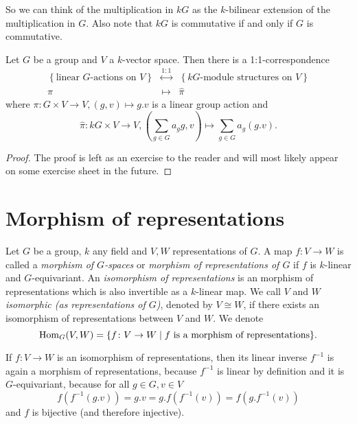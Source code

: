 So we can think of the multiplication in $kG$ as the $k$-bilinear extension of the multiplication in $G$. Also note that $kG$ is commutative if and only if $G$ is commutative.


\begin{lem}
  Let $G$ be a group and $V$ a $k$-vector space. Then there is a 1:1-correspondence
  \[
  \begin{matrix}
        \left\{\text{linear $G$-actions on $V$}\right\}
    & \overset{1:1}{\longleftrightarrow}
    & \left\{\text{$kG$-module structures on $V$}\right\} \\
        \pi
    & \longmapsto
    & \hat{\pi}
    \end{matrix}
  \]
  where $\pi \colon G \times V \to V, (g,v) \mapsto g.v$ is a linear group action and
  \[
    \hat{\pi} \colon kG \times V \to V, \left(\sum_{g \in G} a_g g, v\right) \mapsto \sum_{g \in G} a_g (g.v).
  \]
\end{lem}
\begin{proof}
  The proof is left as an exercise to the reader and will most likely appear on some exercise sheet in the future.
\end{proof}





\section{Morphism of representations}


\begin{defi}
Let $G$ be a group, $k$ any field and $V,W$ representations of $G$. A map $f \colon V \to W$ is called a \emph{morphism of $G$-spaces} or \emph{morphism of representations of $G$} if $f$ is $k$-linear and $G$-equivariant. An \emph{isomorphism of representations} is an morphism of representations which is also invertible as a $k$-linear map. We call $V$ and $W$ \emph{isomorphic (as representations of $G$)}, denoted by $V \cong W$, if there exists an isomorphism of representations between $V$ and $W$. We denote
\[
  \operatorname{Hom}_G(V,W) = \{f \colon V \to W \mid f \text{ is a morphism of representations}\}.
\]
\end{defi}


\begin{rem}
  If $f \colon V \to W$ is an isomorphism of representations, then its linear inverse $f^{-1}$ is again a morphism of representations, because $f^{-1}$ is linear by definition and it is $G$-equivariant, because for all $g \in G, v \in V$
  \[
    f\left(f^{-1}(g.v)\right) = g.v = g.f\left(f^{-1}(v)\right) = f\left(g.f^{-1}(v)\right)
  \]
  and $f$ is bijective (and therefore injective).
\end{rem}



